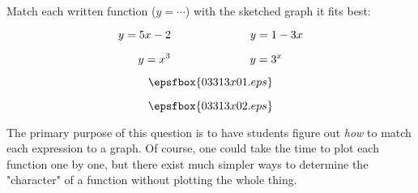 

Match each written function ($y = \cdots$) with the sketched graph it fits best:

$$y = 5x - 2 \hbox{\hskip 70pt} y = 1 - 3x$$

$$y = x^3 \hbox{\hskip 70pt} y = 3^x$$

$$\epsfbox{03313x01.eps}$$







$$\epsfbox{03313x02.eps}$$







The primary purpose of this question is to have students figure out {\it how} to match each expression to a graph.  Of course, one could take the time to plot each function one by one, but there exist much simpler ways to determine the "character" of a function without plotting the whole thing.




